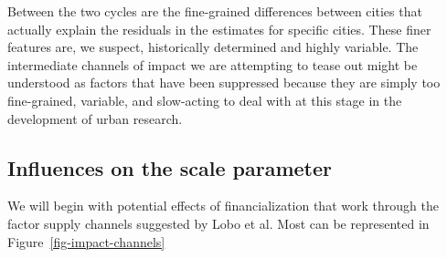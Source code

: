  Between the two cycles are the fine-grained differences between cities that actually explain the residuals in the estimates for specific cities. These finer features are, we suspect, historically determined and highly variable. 
The intermediate channels of impact we are attempting to tease out %
might be understood as factors that have been suppressed because they are simply too fine-grained, variable, and slow-acting  to deal with at this stage in the development of urban research.




\subsection{Influences on the scale parameter}

We will begin with potential effects of financialization  that work through the factor supply channels suggested by Lobo et al. Most  can be represented in Figure~\ref{fig-impact-channels}

